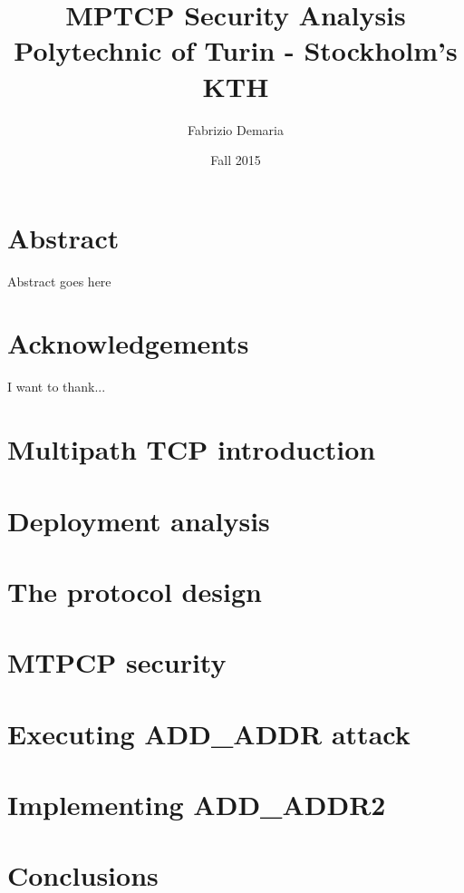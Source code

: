 \documentclass[12pt]{report}
\title{
	{MPTCP Security Analysis}\\
	{\large Polytechnic of Turin - Stockholm's KTH}\\
}
\author{Fabrizio Demaria}
\date{Fall 2015}
\begin{document}
\maketitle


\chapter*{Abstract}
Abstract goes here

\chapter*{Acknowledgements}
I want to thank...

\tableofcontents

\chapter{Multipath TCP introduction}


\chapter{Deployment analysis}


\chapter{The protocol design}
\label{chap:theprotocoldesign}


\chapter{MTPCP security}



\chapter{Executing ADD\_ADDR attack}


\chapter{Implementing ADD\_ADDR2}


\chapter{Conclusions}

\end{document}

